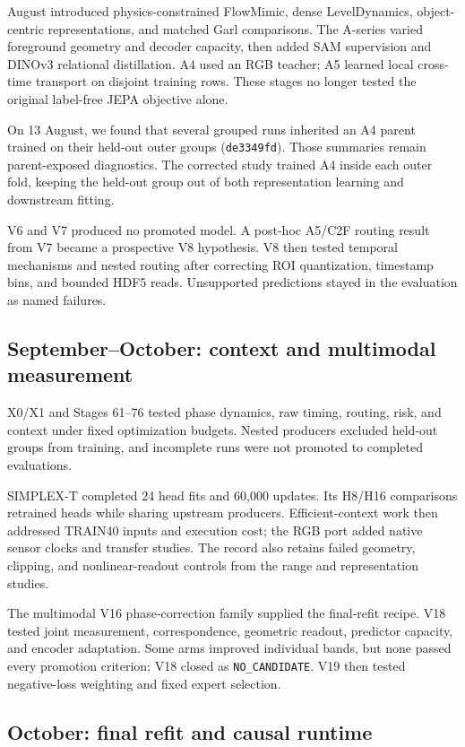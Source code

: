 August introduced physics-constrained FlowMimic, dense LevelDynamics,
object-centric representations, and matched Garl comparisons. The A-series
varied foreground geometry and decoder capacity, then added SAM supervision and
DINOv3 relational distillation. A4 used an RGB teacher; A5 learned local
cross-time transport on disjoint training rows. These stages no longer tested
the original label-free JEPA objective alone.

On 13 August, we found that several grouped runs inherited an A4 parent trained
on their held-out outer groups (\texttt{de3349fd}). Those summaries remain
parent-exposed diagnostics. The corrected study trained A4 inside each outer
fold, keeping the held-out group out of both representation learning and
downstream fitting.

V6 and V7 produced no promoted model. A post-hoc A5/C2F routing result from V7
became a prospective V8 hypothesis. V8 then tested temporal mechanisms and
nested routing after correcting ROI quantization, timestamp bins, and bounded
HDF5 reads. Unsupported predictions stayed in the evaluation as named failures.

\subsection{September--October: context and multimodal measurement}

X0/X1 and Stages 61--76 tested phase dynamics, raw timing, routing, risk, and
context under fixed optimization budgets. Nested producers excluded held-out
groups from training, and incomplete runs were not promoted to completed
evaluations.

SIMPLEX-T completed 24 head fits and 60,000 updates. Its H8/H16 comparisons
retrained heads while sharing upstream producers. Efficient-context work then
addressed TRAIN40 inputs and execution cost; the RGB port added native sensor
clocks and transfer studies. The record also retains failed geometry, clipping,
and nonlinear-readout controls from the range and representation studies.

The multimodal V16 phase-correction family supplied the final-refit recipe.
V18 tested joint measurement, correspondence, geometric readout, predictor
capacity, and encoder adaptation. Some arms improved individual bands, but none
passed every promotion criterion; V18 closed as \texttt{NO\_CANDIDATE}. V19
then tested negative-loss weighting and fixed expert selection.

\subsection{October: final refit and causal runtime}

